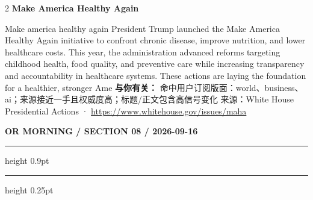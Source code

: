 \documentclass[10.5pt]{ctexart}
\begin{document}
\begin{multicols}{2}
{\large\bfseries Make America Healthy Again}\par
Make america healthy again President Trump launched the Make America Healthy Again initiative to confront chronic disease, improve nutrition, and lower healthcare costs. This year, the administration advanced reforms targeting childhood health, food quality, and preventive care while increasing transparency and accountability in healthcare systems. These actions are laying the foundation for a healthier, stronger Ame
\textbf{与你有关：} 命中用户订阅版面：world、business、ai；来源接近一手且权威度高；标题/正文包含高信号变化
{\footnotesize\color{ormuted} 来源：White House Presidential Actions · \url{https://www.whitehouse.gov/issues/maha}}
\end{multicols}
\newpage
{\small\bfseries OR MORNING / SECTION 08 / 2026-09-16}
\vspace{2mm}
\hrule height 0.9pt
\vspace{1.5mm}
\hrule height 0.25pt
\vspace{4mm}
\end{document}

